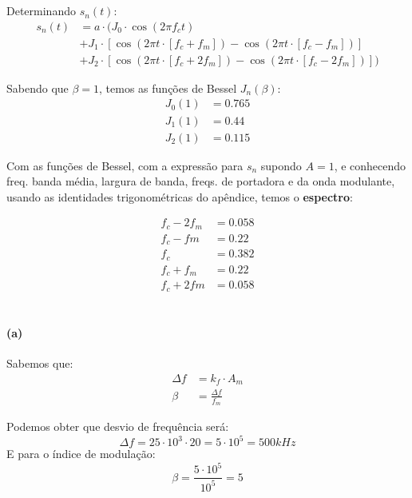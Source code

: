 \section{}

Determinando $s_n(t)$:
\begin{align*}
    s_n (t) &= a \cdot (J_0\cdot \cos(2\pi f_c t) \\
    &+ J_1 \cdot [\cos(2\pi t \cdot [f_c + f_m]) - \cos(2\pi t \cdot [f_c - f_m])]\\
    &+ J_2 \cdot [\cos(2\pi t \cdot [f_c + 2 f_m]) - \cos(2\pi t \cdot [f_c - 2 f_m])])
\end{align*}

Sabendo que $\beta = 1$, temos as funções de Bessel $J_n(\beta)$:
\begin{align*}
    J_0 (1) &= 0.765\\
    J_1 (1) &= 0.44\\
    J_2 (1) &= 0.115
\end{align*}

Com as funções de Bessel, com a expressão para $s_n$ supondo $A=1$, e conhecendo freq. banda média, largura de banda, freqs. de portadora e da onda modulante, usando as identidades trigonométricas do apêndice, temos o \textbf{espectro}:

\begin{align*}
    f_c - 2f_m &= 0.058\\
    f_c - fm &= 0.22\\
    f_c &= 0.382\\
    f_c + f_m &= 0.22\\
    f_c + 2fm &= 0.058
\end{align*}

\section{}
\paragraph{(a)}

Sabemos que:
\begin{align*}
    \Delta f &= k_f \cdot A_m\\
    \beta &= \frac{\Delta f}{f_m}
\end{align*}

Podemos obter que desvio de frequência será: 
$$
    \Delta f = 25 \cdot 10^3 \cdot 20 = 5 \cdot 10^5 = 500 kHz
$$
E para o índice de modulação:
$$
    \beta = \frac{5 \cdot 10^5}{10^5} = 5
$$

